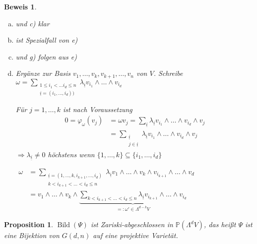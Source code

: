 \documentclass[a4paper, 12pt, numbers=noendperiod, chapterprefix=true, headsepline]{scrbook}
\theoremstyle{break}
\newtheorem{Prop}[Def]{Proposition}
\theoremstyle{nonumberbreak}
\newtheorem{Bew}{Beweis}
\theoremstyle{nonumberplain}
\newcommand{\Sum}{\sum\limits}
\DeclareMathOperator{\Bild}{Bild}
\newcommand{\IP}{\mathbb{P}}%
\begin{document}
\begin{Bew}\begin{enumerate}[a)]
\item[b)]
	und c) klar
\item[d)]
	ist Spezialfall von e)
\item[f)]
	und g) folgen aus e)
\item[e)]
	Erg\"anze zur Basis $v_1,\ldots ,v_k,v_{k+1},\ldots ,v_n$ von $V$. Schreibe $\omega=\Sum_{\substack{1\le i_1<\ldots i_d\le n \\ \underline{i}=(i_1,\ldots ,i_d))}} \lambda_{\underline{i}}v_{i_1}\wedge\ldots \wedge v_{i_d}$
	
	F\"ur $j=1,\ldots ,k$ ist nach Voraussetzung
	\[\begin{array}{rl}
		0=\varphi_{\omega}(v_j)&=\omega v_j=\Sum_{\underline i} \lambda_{\underline{i}}v_{i_1}\wedge\ldots \wedge v_{i_d}\wedge v_j\\
		&=\Sum_{\substack{\underline i\\j\in \underline i}} \lambda_{\underline{i}}v_{i_1}\wedge\ldots \wedge v_{i_d}\wedge v_j
	\end{array}\]
	$\Rightarrow \lambda_{\underline i} \neq 0$ h\"ochstens wenn $\{1,\ldots ,k\}\subseteq\{i_1,\ldots ,i_d\}$
	
	$\begin{array}{rl}\omega&= \Sum_{\substack{\underline{i} =(1,\ldots,k,i_{k+1},\ldots, i_d)\\k<i_{k+1}<\ldots<i_d\le n}} \lambda_{\underline i} v_1\wedge\ldots \wedge v_k \wedge v_{i_{k+1}} \wedge \ldots \wedge v_d\\
	&= v_1 \wedge\ldots \wedge v_k \wedge \underbrace{\Sum_{k<i_{k+1}<\ldots <i_d\le n} \lambda_{\underline i} v_{i_{k+1}}\wedge\ldots \wedge v_{i_d}}_{=: \omega'\in\Lambda^{d-k}V}\end{array}$
\end{enumerate}\end{Bew}

\begin{Prop}
$\Bild(\Psi)$ ist Zariski-abgeschlossen in $\IP(\Lambda^dV)$, das hei\ss t $\Psi$ ist eine Bijektion von $G(d,n)$ auf eine projektive Variet\"at.
\end{Prop}
\end{document}

